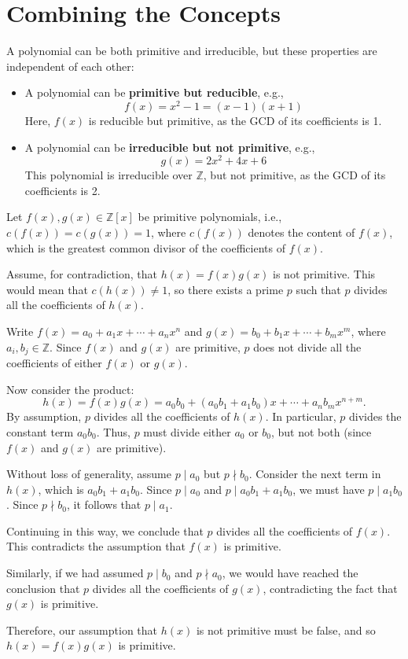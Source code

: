 \documentclass{article}
\newenvironment{proofbox}
  {\begin{mdframed}[linewidth=1pt,linecolor=black,backgroundcolor=white]\noindent\ignorespaces}
  {\end{mdframed}}
\begin{document}
\section*{Combining the Concepts}
A polynomial can be both primitive and irreducible, but these properties are independent of each other:
\begin{itemize}
    \item A polynomial can be \textbf{primitive but reducible}, e.g., 
    \[
    f(x) = x^2 - 1 = (x - 1)(x + 1)
    \]
    Here, $f(x)$ is reducible but primitive, as the GCD of its coefficients is 1.
    
    \item A polynomial can be \textbf{irreducible but not primitive}, e.g.,
    \[
    g(x) = 2x^2 + 4x + 6
    \]
    This polynomial is irreducible over $\mathbb{Z}$, but not primitive, as the GCD of its coefficients is 2.
\end{itemize}



\begin{proofbox}
    Let $f(x), g(x) \in \mathbb{Z}[x]$ be primitive polynomials, i.e., $c(f(x)) = c(g(x)) = 1$, where $c(f(x))$ denotes the content of $f(x)$, which is the greatest common divisor of the coefficients of $f(x)$.
    
    Assume, for contradiction, that $h(x) = f(x)g(x)$ is not primitive. This would mean that $c(h(x)) \neq 1$, so there exists a prime $p$ such that $p$ divides all the coefficients of $h(x)$.

    Write $f(x) = a_0 + a_1x + \cdots + a_nx^n$ and $g(x) = b_0 + b_1x + \cdots + b_mx^m$, where $a_i, b_j \in \mathbb{Z}$. Since $f(x)$ and $g(x)$ are primitive, $p$ does not divide all the coefficients of either $f(x)$ or $g(x)$.

    Now consider the product:
    \[
    h(x) = f(x)g(x) = a_0b_0 + (a_0b_1 + a_1b_0)x + \cdots + a_nb_mx^{n+m}.
    \]
    By assumption, $p$ divides all the coefficients of $h(x)$. In particular, $p$ divides the constant term $a_0b_0$. Thus, $p$ must divide either $a_0$ or $b_0$, but not both (since $f(x)$ and $g(x)$ are primitive).

    Without loss of generality, assume $p \mid a_0$ but $p \nmid b_0$. Consider the next term in $h(x)$, which is $a_0b_1 + a_1b_0$. Since $p \mid a_0$ and $p \mid a_0b_1 + a_1b_0$, we must have $p \mid a_1b_0$. Since $p \nmid b_0$, it follows that $p \mid a_1$.

    Continuing in this way, we conclude that $p$ divides all the coefficients of $f(x)$. This contradicts the assumption that $f(x)$ is primitive.

    Similarly, if we had assumed $p \mid b_0$ and $p \nmid a_0$, we would have reached the conclusion that $p$ divides all the coefficients of $g(x)$, contradicting the fact that $g(x)$ is primitive.

    Therefore, our assumption that $h(x)$ is not primitive must be false, and so $h(x) = f(x)g(x)$ is primitive.
\end{proofbox}
\end{document}
